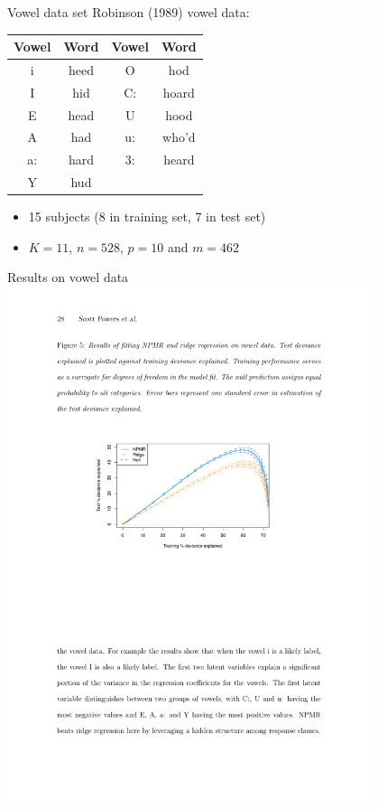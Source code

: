 \documentclass[handout]{beamer}
\begin{document}
\begin{frame}{Vowel data set}
Robinson (1989) vowel data:
\begin{center}
\begin{tabular}{cc|cc}
Vowel   & Word  & Vowel & Word\\
\hline
i       & heed  & O     & hod\\
I       & hid   & C:    & hoard\\
E       & head  & U     & hood\\
A       & had   & u:    & who'd\\
a:      & hard  & 3:    & heard\\
Y       & hud
\end{tabular}
\end{center}
\begin{itemize}
    \item 15 subjects (8 in training set, 7 in test set)
    \item $K = 11$, $n = 528$, $p = 10$ and $m = 462$
\end{itemize}
\end{frame}

\begin{frame}{Results on vowel data}
\centering
\includegraphics[width = 0.8\textwidth]{figures/vowel.pdf}
\end{frame}
\end{document}
